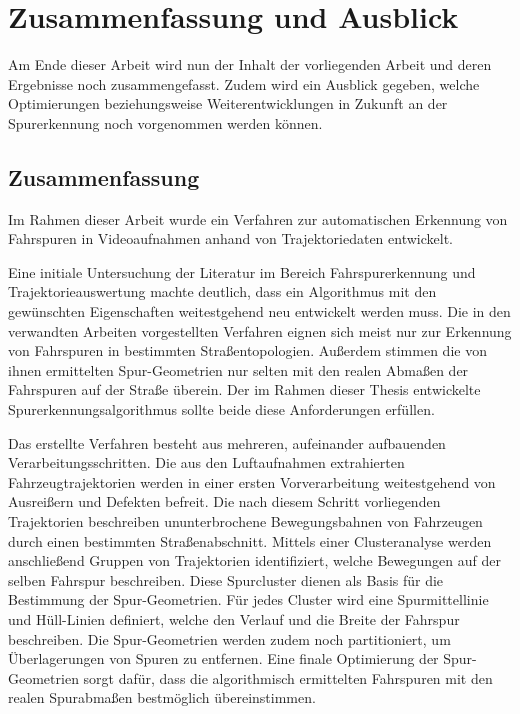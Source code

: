 
\chapter{Zusammenfassung und Ausblick}
\label{cha:end}

Am Ende dieser Arbeit wird nun der Inhalt der vorliegenden Arbeit und deren Ergebnisse noch
zusammengefasst. Zudem wird ein Ausblick gegeben, welche Optimierungen beziehungsweise
Weiterentwicklungen in Zukunft an der Spurerkennung noch vorgenommen werden können.

\section{Zusammenfassung}

Im Rahmen dieser Arbeit wurde ein Verfahren zur automatischen Erkennung von Fahrspuren in Videoaufnahmen
anhand von Trajektoriedaten entwickelt.

Eine initiale Untersuchung der Literatur im Bereich Fahrspurerkennung und Trajektorieauswertung
machte deutlich, dass ein Algorithmus mit den gewünschten Eigenschaften weitestgehend neu entwickelt werden muss.
Die in den verwandten Arbeiten vorgestellten Verfahren eignen sich meist nur zur Erkennung von Fahrspuren
in bestimmten Straßentopologien. Außerdem stimmen die von ihnen ermittelten Spur-Geometrien nur selten
mit den realen Abmaßen der Fahrspuren auf der Straße überein.
Der im Rahmen dieser Thesis entwickelte Spurerkennungsalgorithmus sollte beide diese Anforderungen erfüllen.

Das erstellte Verfahren besteht aus mehreren, aufeinander aufbauenden Verarbeitungsschritten. Die aus den
Luftaufnahmen extrahierten Fahrzeugtrajektorien werden in einer ersten Vorverarbeitung weitestgehend von
Ausreißern und Defekten befreit. Die nach diesem Schritt vorliegenden Trajektorien beschreiben
ununterbrochene Bewegungsbahnen von Fahrzeugen durch einen bestimmten Straßenabschnitt.
Mittels einer Clusteranalyse werden anschließend Gruppen von Trajektorien identifiziert, welche Bewegungen
auf der selben Fahrspur beschreiben.
Diese Spurcluster dienen als Basis für die Bestimmung der Spur-Geometrien. Für jedes Cluster wird eine
Spurmittellinie und Hüll-Linien definiert, welche den Verlauf und die Breite der Fahrspur beschreiben.
Die Spur-Geometrien werden zudem noch partitioniert, um Überlagerungen von Spuren zu entfernen.
Eine finale Optimierung der Spur-Geometrien sorgt dafür, dass die algorithmisch ermittelten Fahrspuren
mit den realen Spurabmaßen bestmöglich übereinstimmen. 

